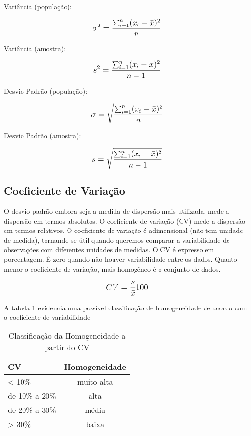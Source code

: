 Variância (população):

\[\beq{ \sigma^2=\frac{\sum_{i=1}^{n} (x_i - \bar{x})^2}{n} }\]

Variância (amostra):

\[\beq{ s^2=\frac{\sum_{i=1}^{n} (x_i - \bar{x})^2}{n-1} }\]

Desvio Padrão (população):

\[\beq{ \sigma=\sqrt{\frac{\sum_{i=1}^{n} (x_i - \bar{x})^2}{n}} }\]

Desvio Padrão (amostra):

\[\beq{ s=\sqrt{\frac{\sum_{i=1}^{n} (x_i - \bar{x})^2}{n-1}} }\]

\subsection{Coeficiente de Variação}

O desvio padrão embora seja a medida de dispersão mais utilizada, mede a dispersão em termos absolutos. O coeficiente de variação (CV) mede a dispersão em termos relativos. O coeficiente de variação é adimensional (não tem unidade de medida), tornando-se útil quando queremos comparar a variabilidade de observações com diferentes unidades de medidas. O CV é expresso em porcentagem. É zero quando não houver variabilidade entre os dados. Quanto menor o coeficiente de variação, mais
homogêneo é o conjunto de dados.

\[\beq{ CV=\frac{s}{\bar{x}} 100 }\]

A tabela \ref{tab:coeficiente-variabilidade} evidencia uma possível classificação de homogeneidade de acordo com o coeficiente de variabilidade.

\begin{table}[h]
	\centering	
	\caption{Classificação da Homogeneidade a partir do CV}
	\label{tab:coeficiente-variabilidade}
	\begin{tabular}{l|c} 
		CV 		& Homogeneidade	\\
		\hline
		< 10\%		& muito alta	\\
		de 10\% a 20\%	& alta		\\
		de 20\% a 30\%	& média		\\
		> 30\%			& baixa		
	\end{tabular}
\end{table}

